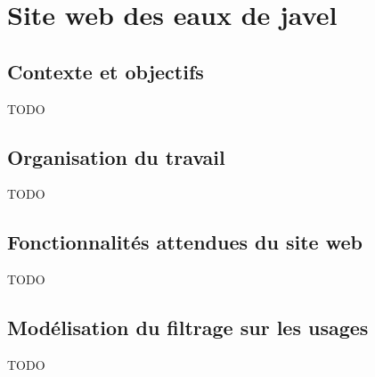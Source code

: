 \section{Site web des eaux de javel \alc}

\subsection{Contexte et objectifs}

TODO


\subsection{Organisation du travail}

TODO


\subsection{Fonctionnalités attendues du site web}

TODO


\subsection{Modélisation du filtrage sur les usages}

TODO
